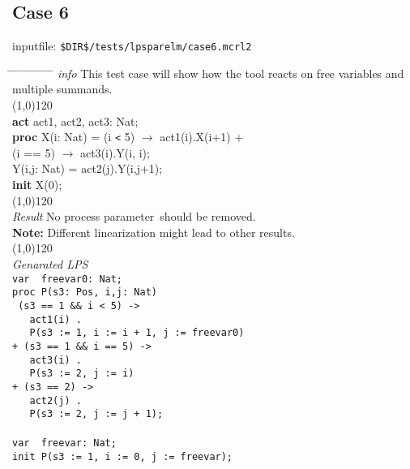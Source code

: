 \documentclass[a4paper,10pt]{article}
\theoremstyle{plain}
\theoremstyle{definition}
\newcommand{\ti}{\textit}
\newcommand{\tb}{\textbf}
\newcommand{\pp}{process parameter}
\newcommand{\tabw}{\hspace*{15.mm} \= \hspace*{20.mm} \= \hspace*{5.mm} \= \hspace*{5.mm} \= \hspace*{5.mm} \= \hspace*{5.mm}  \= \hspace*{5.mm}  \= \hspace*{5.mm}  \= \hspace*{5.mm} \= \hspace*{5.mm} \= \hspace*{5.mm}  \= \hspace*{5.mm}  \= \hspace*{5.mm}\kill}
\begin{document}
\subsection*{Case 6}
inputfile: \verb"$DIR$/tests/lpsparelm/case6.mcrl2"
\begin{tabbing}
\tabw
\ti{info} \> This test case will show how the tool reacts on free variables and multiple summands.\\
\line(1,0){120}\\
\tb{act} \> act1, act2, act3: Nat; \\
\tb{proc} \> X(i: Nat) \>  = \> (i \verb"<" 5) $\rightarrow$ act1(i).X(i+1) + \\
\> \> \>     (i == 5) $\rightarrow$ act3(i).Y(i, i); \\
\>     Y(i,j: Nat) \> = \> act2(j).Y(i,j+1); \\
\tb{init} X(0); \\
\line(1,0){120}\\
\ti{Result} \> No \pp\ should be removed.\\ 
\> \textbf{Note:} Different linearization might lead to other results.\\
\line(1,0){120}\\
\ti{Genarated LPS} \\
\>  \verb"var  freevar0: Nat;"\\
\>  \verb"proc P(s3: Pos, i,j: Nat)"\\
\>  \verb" (s3 == 1 && i < 5) ->"\\
\>  \verb"   act1(i) ."\\
\>  \verb"   P(s3 := 1, i := i + 1, j := freevar0)"\\
\>  \verb"+ (s3 == 1 && i == 5) ->"\\
\>  \verb"   act3(i) ."\\
\>  \verb"   P(s3 := 2, j := i)"\\
\>  \verb"+ (s3 == 2) ->"\\
\>  \verb"   act2(j) ."\\
\>  \verb"   P(s3 := 2, j := j + 1);"\\
\\
\>  \verb"var  freevar: Nat;"\\
\>  \verb"init P(s3 := 1, i := 0, j := freevar);"\\
\end{tabbing}
\end{document}
